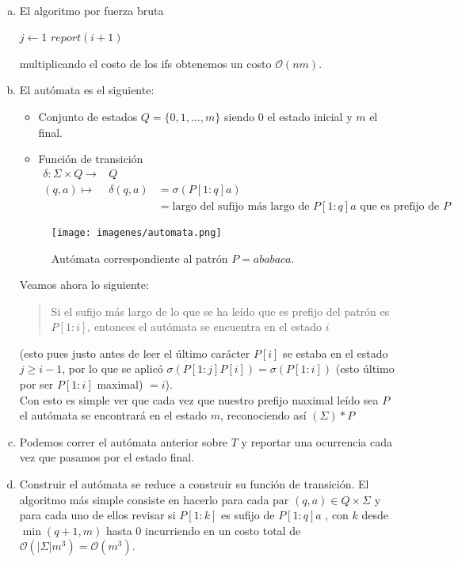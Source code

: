\documentclass[dcc,uchile]{fcfmcourse}
\theoremstyle{plain}
\theoremstyle{definition}
\begin{document}
\begin{problems}
\\
\begin{enumerate}[a)]
    \item El algoritmo por fuerza bruta\\
    \begin{algorithm}[H]
        \SetAlgoLined
         {
            $j\gets 1$
             {
            }
             {
                $report(i+1)$
            }
        }
    \end{algorithm}
    multiplicando el costo de los ifs obtenemos un costo $\mathcal{O}(nm)$.
    \item El autómata es el siguiente:
    \begin{itemize}
    \item Conjunto de estados $Q=\{0, 1, \ldots, m\}$ siendo $0$ el estado inicial y $m$ el final.
    \item Función de transición 
    \begin{eqnarray*}
    \delta: \Sigma \times Q \to & Q & \\
    (q, a) \mapsto &\delta(q, a) &= \sigma(P[1:q]a) \\
    &  &= \text{largo del sufijo más largo de $P[1:q]a$ que es prefijo de $P$}
    \end{eqnarray*}
    \end{itemize}
\begin{figure}[h]\footnotesize
  \begin{center}
      \texttt{[image: imagenes/automata.png]}
  \caption{Autómata correspondiente al patrón $P=ababaca$.}
  \end{center}
\end{figure}
Veamos ahora lo siguiente:
\begin{quote}
    Si el sufijo más largo de lo que se ha
    leído que es prefijo del patrón es $P[1:i]$, entonces el autómata se encuentra en el estado $i$
\end{quote}
(esto pues justo antes de leer el último carácter $P[i]$ se estaba en el estado $j\ge i-1$, por lo que se aplicó $\sigma(P[1:j]P[i]) = \sigma(P[1:i])$ (esto último por ser $P[1:i]$ maximal) $= i$).\\
Con esto es simple ver que cada vez que nuestro prefijo maximal leído sea $P$ el autómata se encontrará en el estado $m$, reconociendo así $(\Sigma)*P$
    \item Podemos correr el autómata anterior sobre $T$ y reportar una ocurrencia cada vez que pasamos por el estado final.
    \item
    Construir el autómata se reduce a construir su función de transición. El algoritmo más simple consiste en hacerlo para cada par $(q, a)\in Q \times \Sigma$ y para cada uno de ellos revisar si $P[1:k]$ es sufijo de $P[1:q]a$ , con $k$ desde $\min(q+1, m)$ hasta $0$ incurriendo en un costo total de $\mathcal{O}(|\Sigma|m^3) = \mathcal{O}(m^3)$.\\
    

\end{enumerate}
\end{problems}
\end{document}
